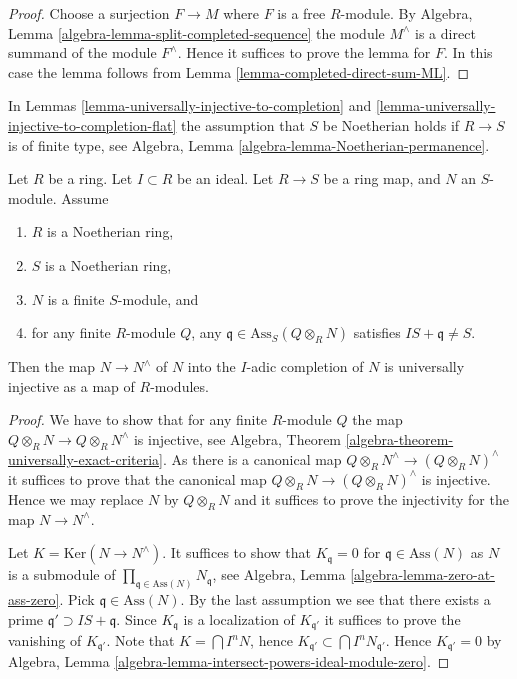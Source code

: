 \begin{proof}
Choose a surjection $F \to M$ where $F$ is a free $R$-module. By
Algebra, Lemma \ref{algebra-lemma-split-completed-sequence}
the module $M^\wedge$ is a direct summand of the module $F^\wedge$.
Hence it suffices to prove the lemma for $F$.
In this case the lemma follows from
Lemma \ref{lemma-completed-direct-sum-ML}.
\end{proof}

\noindent
In
Lemmas \ref{lemma-universally-injective-to-completion} and
\ref{lemma-universally-injective-to-completion-flat}
the assumption that $S$ be Noetherian holds if $R \to S$ is of finite type, see
Algebra, Lemma \ref{algebra-lemma-Noetherian-permanence}.

\begin{lemma}
\label{lemma-universally-injective-to-completion}
Let $R$ be a ring.
Let $I \subset R$ be an ideal.
Let $R \to S$ be a ring map, and $N$ an $S$-module.
Assume
\begin{enumerate}
\item $R$ is a Noetherian ring,
\item $S$ is a Noetherian ring,
\item $N$ is a finite $S$-module, and
\item for any finite $R$-module $Q$, any
$\mathfrak q \in \text{Ass}_S(Q \otimes_R N)$
satisfies $IS + \mathfrak q \not = S$.
\end{enumerate}
Then the map $N \to N^\wedge$ of $N$ into the $I$-adic completion of $N$
is universally injective as a map of $R$-modules.
\end{lemma}

\begin{proof}
We have to show that for any finite $R$-module $Q$ the map
$Q \otimes_R N \to Q \otimes_R N^\wedge$ is injective, see
Algebra, Theorem \ref{algebra-theorem-universally-exact-criteria}.
As there is a canonical map $Q \otimes_R N^\wedge \to (Q \otimes_R N)^\wedge$
it suffices to prove that the canonical map
$Q \otimes_R N \to (Q \otimes_R N)^\wedge$ is injective.
Hence we may replace $N$ by $Q \otimes_R N$ and it suffices to prove the
injectivity for the map $N \to N^\wedge$.

\medskip\noindent
Let $K = \text{Ker}(N \to N^\wedge)$. It suffices to show that
$K_{\mathfrak q} = 0$ for $\mathfrak q \in \text{Ass}(N)$ as $N$ is a
submodule of $\prod_{\mathfrak q \in \text{Ass}(N)} N_{\mathfrak q}$, see
Algebra, Lemma \ref{algebra-lemma-zero-at-ass-zero}.
Pick $\mathfrak q \in \text{Ass}(N)$. By the last assumption we see that
there exists a prime $\mathfrak q' \supset IS + \mathfrak q$.
Since $K_{\mathfrak q}$ is a localization of $K_{\mathfrak q'}$
it suffices to prove the vanishing of $K_{\mathfrak q'}$.
Note that $K = \bigcap I^nN$, hence
$K_{\mathfrak q'} \subset \bigcap I^nN_{\mathfrak q'}$.
Hence $K_{\mathfrak q'} = 0$ by
Algebra, Lemma \ref{algebra-lemma-intersect-powers-ideal-module-zero}.
\end{proof}

